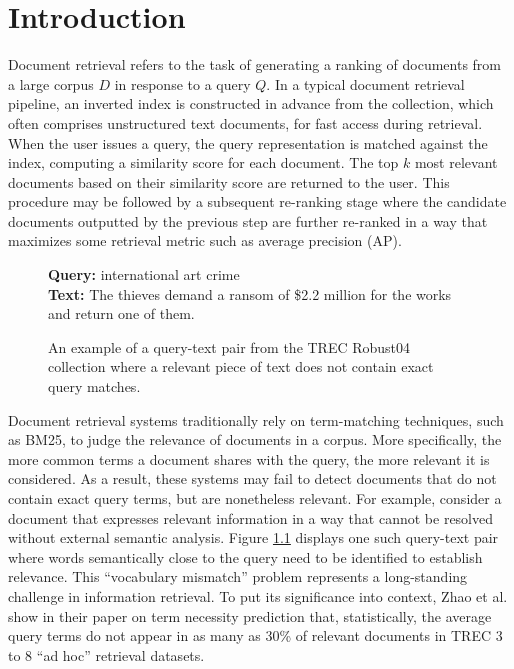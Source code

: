 \chapter{Introduction}
\label{intro}

Document retrieval refers to the task of generating a ranking of documents from a large corpus $ D $ in response to a query $ Q $.
In a typical document retrieval pipeline, an inverted index is constructed in advance from the collection, which often comprises unstructured text documents, for fast access during retrieval.
When the user issues a query, the query representation is matched against the index, computing a similarity score for each document.
The top $ k $ most relevant documents based on their similarity score are returned to the user.
This procedure may be followed by a subsequent re-ranking stage where the candidate documents outputted by the previous step are further re-ranked in a way that maximizes some retrieval metric such as average precision (AP).

\begin{figure}[b!]
	\begin{framed}
    		\textbf{Query:} international art crime \\
    		\textbf{Text:} The thieves demand a ransom of \$2.2 million for the works and return one of them.
	\end{framed}
\label{query-sent-example}
 \caption{An example of a query-text pair from the TREC Robust04 collection where a relevant piece of text does not contain exact query matches.}
\end{figure}

Document retrieval systems traditionally rely on term-matching techniques, such as BM25, to judge the relevance of documents in a corpus.
More specifically, the more common terms a document shares with the query, the more relevant it is considered.
As a result, these systems may fail to detect documents that do not contain exact query terms, but are nonetheless relevant.
For example, consider a document that expresses relevant information in a way that cannot be resolved without external semantic analysis.
Figure \ref{query-sent-example} displays one such query-text pair where words semantically close to the query need to be identified to establish relevance.
This ``vocabulary mismatch'' problem represents a long-standing challenge in information retrieval.
To put its significance into context, Zhao et al. \cite{zhao2010term} show in their paper on term necessity prediction that, statistically, the average query terms do not appear in as many as 30\% of relevant documents in TREC 3 to 8 ``ad hoc'' retrieval datasets.


